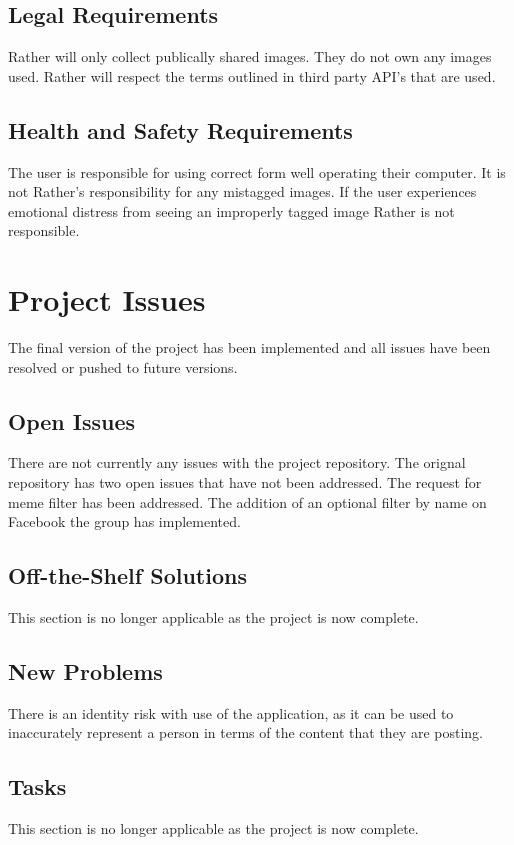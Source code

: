 \documentclass[12pt, titlepage]{article}
\begin{document}
\subsection{Legal Requirements}
Rather will only collect publically shared images. They do not own any images used. Rather will respect the terms outlined in third party API's that are used.

\subsection{Health and Safety Requirements}
The user is responsible for using correct form well operating their computer. It is not Rather's responsibility for any mistagged images. If the user experiences emotional distress from seeing an improperly tagged image Rather is not responsible. 
\section{Project Issues}
The final version of the project has been implemented and all issues have been resolved or pushed to future versions.

\subsection{Open Issues}
There are not currently any issues with the project repository. The orignal repository has two open issues that have not been addressed. The request for meme filter has been addressed. The addition of an optional filter by name on Facebook the group has implemented. 

\subsection{Off-the-Shelf Solutions}
This section is no longer applicable as the project is now complete.

\subsection{New Problems}
There is an identity risk with use of the application, as it can be used to inaccurately represent a person in terms of the content that they are posting.

\subsection{Tasks}
This section is no longer applicable as the project is now complete.
\end{document}
